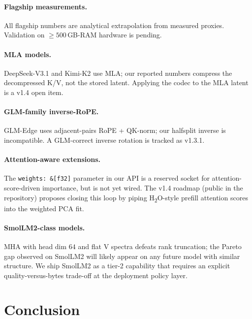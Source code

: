 \documentclass[11pt,a4paper]{article}
\theoremstyle{definition}
\theoremstyle{plain}
\begin{document}
\paragraph{Flagship measurements.} All flagship numbers are analytical extrapolation from measured proxies. Validation on $\geq 500$\,GB-RAM hardware is pending.

\paragraph{MLA models.} DeepSeek-V3.1 and Kimi-K2 use MLA; our reported numbers compress the decompressed K/V, not the stored latent. Applying the codec to the MLA latent is a v1.4 open item.

\paragraph{GLM-family inverse-RoPE.} GLM-Edge uses adjacent-pairs RoPE + QK-norm; our halfsplit inverse is incompatible. A GLM-correct inverse rotation is tracked as v1.3.1.

\paragraph{Attention-aware extensions.} The \texttt{weights: \&[f32]} parameter in our API is a reserved socket for attention-score-driven importance, but is not yet wired. The v1.4 roadmap (public in the repository) proposes closing this loop by piping H\textsubscript{2}O-style prefill attention scores into the weighted PCA fit.

\paragraph{SmolLM2-class models.} MHA with head dim $64$ and flat V spectra defeats rank truncation; the Pareto gap observed on SmolLM2 will likely appear on any future model with similar structure. We ship SmolLM2 as a tier-2 capability that requires an explicit quality-versus-bytes trade-off at the deployment policy layer.

\section{Conclusion}
\label{sec:conclusion}
\end{document}
